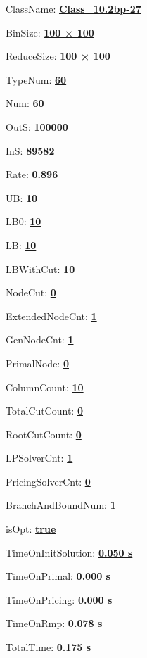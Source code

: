 \documentclass[11pt]{article}
\begin{document}
\pagestyle{empty}


ClassName: \underline{\textbf{Class_10.2bp-27}}
\par
BinSize: \underline{\textbf{100 × 100}}
\par
ReduceSize: \underline{\textbf{100 × 100}}
\par
TypeNum: \underline{\textbf{60}}
\par
Num: \underline{\textbf{60}}
\par
OutS: \underline{\textbf{100000}}
\par
InS: \underline{\textbf{89582}}
\par
Rate: \underline{\textbf{0.896}}
\par
UB: \underline{\textbf{10}}
\par
LB0: \underline{\textbf{10}}
\par
LB: \underline{\textbf{10}}
\par
LBWithCut: \underline{\textbf{10}}
\par
NodeCut: \underline{\textbf{0}}
\par
ExtendedNodeCnt: \underline{\textbf{1}}
\par
GenNodeCnt: \underline{\textbf{1}}
\par
PrimalNode: \underline{\textbf{0}}
\par
ColumnCount: \underline{\textbf{10}}
\par
TotalCutCount: \underline{\textbf{0}}
\par
RootCutCount: \underline{\textbf{0}}
\par
LPSolverCnt: \underline{\textbf{1}}
\par
PricingSolverCnt: \underline{\textbf{0}}
\par
BranchAndBoundNum: \underline{\textbf{1}}
\par
isOpt: \underline{\textbf{true}}
\par
TimeOnInitSolution: \underline{\textbf{0.050 s}}
\par
TimeOnPrimal: \underline{\textbf{0.000 s}}
\par
TimeOnPricing: \underline{\textbf{0.000 s}}
\par
TimeOnRmp: \underline{\textbf{0.078 s}}
\par
TotalTime: \underline{\textbf{0.175 s}}
\par
\newpage


\end{document}
